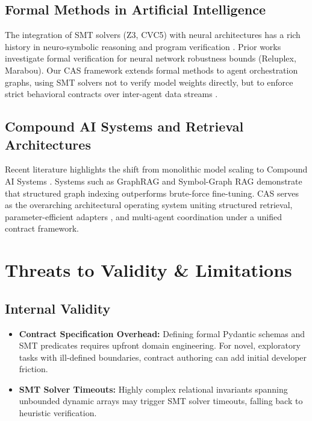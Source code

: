\documentclass[10pt,twocolumn,letterpaper]{article}
\begin{document}
\subsection{Formal Methods in Artificial Intelligence}

The integration of SMT solvers (Z3, CVC5) with neural architectures has a rich history in neuro-symbolic reasoning and program verification \cite{crossref_10_18653_v1_2026_findings_acl_1933}. Prior works investigate formal verification for neural network robustness bounds (Reluplex, Marabou). Our CAS framework extends formal methods to agent orchestration graphs, using SMT solvers not to verify model weights directly, but to enforce strict behavioral contracts over inter-agent data streams \cite{arxiv_2404_01131}.


\subsection{Compound AI Systems and Retrieval Architectures}

Recent literature highlights the shift from monolithic model scaling to Compound AI Systems \cite{arxiv_2406_00584,arxiv_2005_14165}. Systems such as GraphRAG \cite{arxiv_2501_14050} and Symbol-Graph RAG demonstrate that structured graph indexing outperforms brute-force fine-tuning. CAS serves as the overarching architectural operating system uniting structured retrieval, parameter-efficient adapters \cite{arxiv_2305_18290}, and multi-agent coordination under a unified contract framework.




\section{Threats to Validity \& Limitations}



\subsection{Internal Validity}

\begin{itemize}
  \item \textbf{Contract Specification Overhead:} Defining formal Pydantic schemas and SMT predicates requires upfront domain engineering. For novel, exploratory tasks with ill-defined boundaries, contract authoring can add initial developer friction.
  \item \textbf{SMT Solver Timeouts:} Highly complex relational invariants spanning unbounded dynamic arrays may trigger SMT solver timeouts, falling back to heuristic verification.
\end{itemize}
\end{document}
